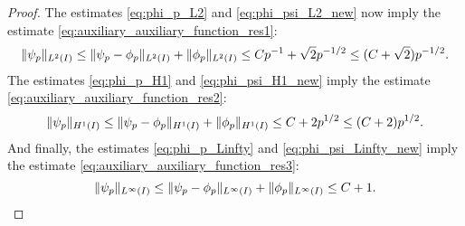 \documentclass[english, 12pt, a4paper, sci, utf8, a-2b, online]{aaltothesis}
\theoremstyle{definition}
\theoremstyle{plain}
\DeclarePairedDelimiter\norm{\lVert}{\rVert}
\numberwithin{equation}{section}
\begin{document}
\begin{proof}
    The estimates \eqref{eq:phi_p_L2} and \eqref{eq:phi_psi_L2_new}
    now imply the estimate \eqref{eq:auxiliary_auxiliary_function_res1}:
    \begin{equation*}
        \norm{\psi_p}_{L^2(I)}
        \leq \norm{\psi_p - \phi_p}_{L^2(I)} + \norm{\phi_p}_{L^2(I)} 
        \leq Cp^{-1} + \sqrt{2} p^{-1/2}
        \leq (C+\sqrt{2}) p^{-1/2}.
    \end{equation*}
    The estimates \eqref{eq:phi_p_H1} and \eqref{eq:phi_psi_H1_new}
    imply the estimate \eqref{eq:auxiliary_auxiliary_function_res2}:
    \begin{equation*}
        \norm{\psi_p}_{H^1(I)}
        \leq \norm{\psi_p - \phi_p}_{H^1(I)} + \norm{\phi_p}_{H^1(I)}
        \leq C + 2p^{1/2}
        \leq (C+2) p^{1/2}.
    \end{equation*}
    And finally,
    the estimates \eqref{eq:phi_p_Linfty} and \eqref{eq:phi_psi_Linfty_new}
    imply the estimate \eqref{eq:auxiliary_auxiliary_function_res3}:
    \begin{equation*}
        \norm{\psi_p}_{L^{\infty}(I)}
        \leq \norm{\psi_p - \phi_p}_{L^{\infty}(I)} + \norm{\phi_p}_{L^{\infty}(I)}
        \leq C + 1.
    \end{equation*}
\end{proof}
\end{document}
